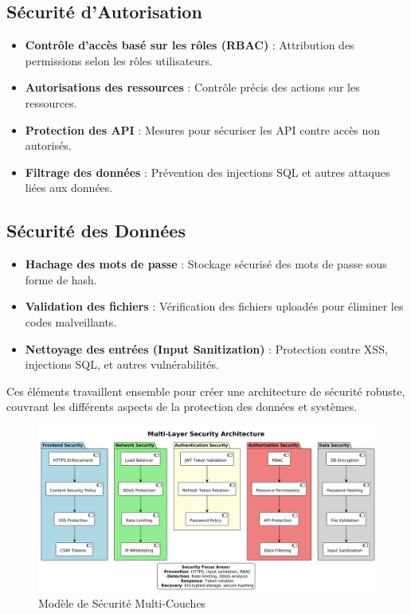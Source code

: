 \documentclass[12pt]{rapportPfe}
\begin{document}
\subsection*{Sécurité d'Autorisation}
\begin{itemize}
  \item \textbf{Contrôle d'accès basé sur les rôles (RBAC)} : Attribution des permissions selon les rôles utilisateurs.
  \item \textbf{Autorisations des ressources} : Contrôle précis des actions sur les ressources.
  \item \textbf{Protection des API} : Mesures pour sécuriser les API contre accès non autorisés.
  \item \textbf{Filtrage des données} : Prévention des injections SQL et autres attaques liées aux données.
\end{itemize}

\subsection*{Sécurité des Données}
\begin{itemize}

  \item \textbf{Hachage des mots de passe} : Stockage sécurisé des mots de passe sous forme de hash.
  \item \textbf{Validation des fichiers} : Vérification des fichiers uploadés pour éliminer les codes malveillants.
  \item \textbf{Nettoyage des entrées (Input Sanitization)} : Protection contre XSS, injections SQL, et autres vulnérabilités.
\end{itemize}

Ces éléments travaillent ensemble pour créer une architecture de sécurité robuste, couvrant les différents aspects de la protection des données et systèmes.


\begin{figure}[htbp]
    \centering
    \includegraphics[width=1.1\textwidth]{diagrams/diagram6.png}
    \caption{Modèle de Sécurité Multi-Couches}
    \label{fig:diagram6}
\end{figure}
\end{document}
